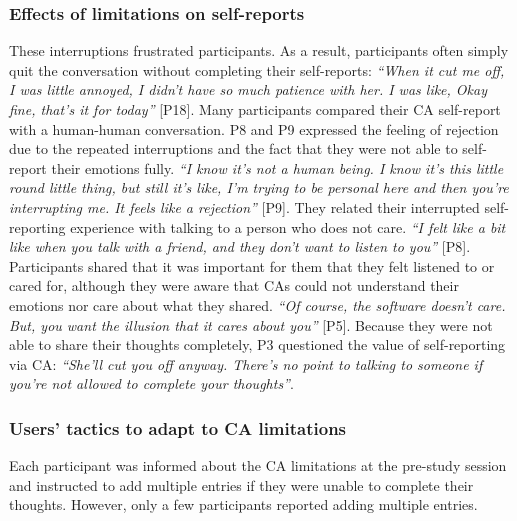         \subsubsection{Effects of  limitations on self-reports}
            These interruptions frustrated participants.
            As a result, participants often simply quit the conversation without completing their self-reports:
                \textit{``When it cut me off, I was little annoyed, I didn't have so much patience with her. I was like, Okay fine, that's it for today''} [P18].
            Many participants compared their \ac{CA} self-report with a human-human conversation. P8 and P9 expressed the feeling of rejection due to the repeated interruptions and the fact that they were not able to self-report their emotions fully.
                \textit{``I know it's not a human being. I know it's this little round little thing, but still it's like, I'm trying to be personal here and then you're interrupting me. It feels like a rejection''} [P9].
            They related their interrupted self-reporting experience with talking to a person who does not care. 
                \textit{``I felt like a bit like when you talk with a friend, and they don't want to listen to you''} [P8].
            Participants shared that it was important for them that they felt listened to or cared for, although they were aware that \acp{CA} could not understand their emotions nor care about what they shared.
                \textit{``Of course, the software doesn't care. But, you want the illusion that it cares about you''} [P5].
            Because they were not able to share their thoughts completely, P3 questioned the value of self-reporting via \ac{CA}: 
                \textit{``She'll cut you off anyway. There's no point to talking to someone if you're not allowed to complete your thoughts''}.
        
        
        
        \subsubsection{Users' tactics to adapt to \ac{CA} limitations}
            Each participant was informed about the \ac{CA} limitations at the pre-study session and instructed to add multiple entries if they were unable to complete their thoughts. However, only a few participants reported adding multiple entries. 

